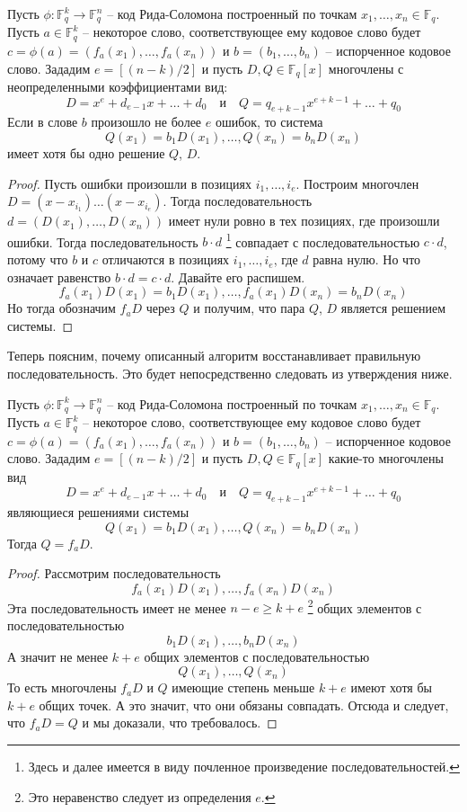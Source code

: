 \begin{claim}
\label{claim::ReedSolomonLemma}
Пусть $\phi\colon \mathbb F_q^k\to \mathbb F_q^n$ -- код Рида-Соломона построенный по точкам $x_1,\ldots, x_n\in \mathbb F_q$.
Пусть $a\in \mathbb F_q^k$ -- некоторое слово, соответствующее ему кодовое слово будет $c =\phi(a)= (f_a(x_1),\ldots,f_a(x_n))$ и $b = (b_1,\ldots,b_n)$ -- испорченное кодовое слово.
Зададим $e = [(n - k)/2]$ и пусть $D, Q\in \mathbb F_q[x]$ многочлены с неопределенными коэффициентами вид:
\[
D = x^e + d_{e-1}x + \ldots + d_0\quad\text{и}\quad
Q = q_{e+k - 1}x^{e+k-1} + \ldots + q_0
\]
Если в слове $b$ произошло не более $e$ ошибок, то система
\[
Q(x_1) = b_1 D(x_1),\ldots,Q(x_n) = b_n D(x_n)
\]
имеет хотя бы одно решение $Q$, $D$.
\end{claim}
\begin{proof}
Пусть ошибки произошли в позициях $i_1,\ldots, i_e$.
Построим многочлен $D = (x - x_{i_1})\ldots ( x - x_{i_e})$.
Тогда последовательность $d = (D(x_1),\ldots, D(x_n))$ имеет нули ровно в тех позициях, где произошли ошибки.
Тогда последовательность $b\cdot d$
\footnote{Здесь и далее имеется в виду почленное произведение последовательностей.}
совпадает с последовательностью $c\cdot d$, потому что $b$ и $c$ отличаются в позициях $i_1,\ldots, i_e$, где $d$ равна нулю.
Но что означает равенство $b\cdot d = c\cdot d$.
Давайте его распишем.
\[
f_a(x_1) D(x_1) = b_1 D(x_1),\ldots,f_a(x_1) D(x_n) = b_n D(x_n)
\]
Но тогда обозначим $f_a D$ через $Q$ и получим, что пара $Q$, $D$ является решением системы.
\end{proof}

Теперь поясним, почему описанный алгоритм восстанавливает правильную последовательность.
Это будет непосредственно следовать из утверждения ниже.

\begin{claim}
\label{claim::ReedSolomonDecoding}
Пусть $\phi\colon \mathbb F_q^k\to \mathbb F_q^n$ -- код Рида-Соломона построенный по точкам $x_1,\ldots, x_n\in \mathbb F_q$.
Пусть $a\in \mathbb F_q^k$ -- некоторое слово, соответствующее ему кодовое слово будет $c =\phi(a)= (f_a(x_1),\ldots,f_a(x_n))$ и $b = (b_1,\ldots,b_n)$ -- испорченное кодовое слово.
Зададим $e = [(n - k)/2]$ и пусть $D, Q\in \mathbb F_q[x]$ какие-то многочлены вид
\[
D = x^e + d_{e-1}x + \ldots + d_0\quad\text{и}\quad
Q = q_{e+k - 1}x^{e+k-1} + \ldots + q_0
\]
являющиеся решениями системы
\[
Q(x_1) = b_1 D(x_1),\ldots,Q(x_n) = b_n D(x_n)
\]
Тогда $Q = f_a D$.
\end{claim}
\begin{proof}
Рассмотрим последовательность
\[
f_a(x_1) D(x_1),\ldots, f_a(x_n)D(x_n)
\]
Эта последовательность имеет не менее $n - e \geqslant k + e$
\footnote{Это неравенство следует из определения $e$.}
общих элементов с последовательностью 
\[
b_1D(x_1),\ldots,b_nD(x_n)
\]
А значит не менее $k + e$ общих элементов с последовательностью
\[
Q(x_1),\ldots, Q(x_n)
\]
То есть многочлены $f_aD$ и $Q$ имеющие степень меньше $k + e$ имеют хотя бы $k + e$ общих точек.
А это значит, что они обязаны совпадать.
Отсюда и следует, что $f_a D = Q$ и мы доказали, что требовалось.
\end{proof}
